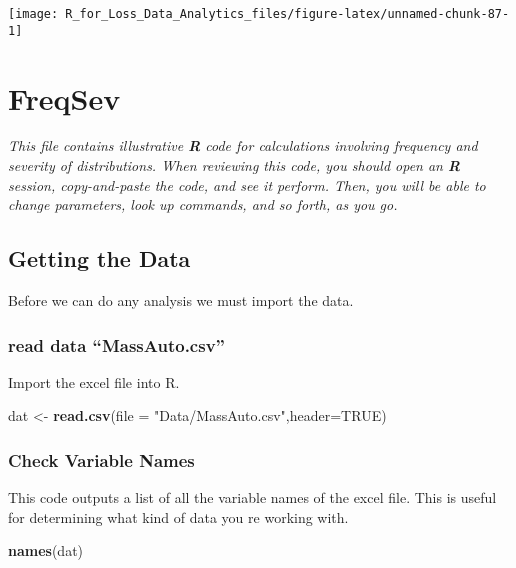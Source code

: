 \documentclass[]{book}
\newenvironment{Shaded}{\begin{snugshade}}{\end{snugshade}}
\newcommand{\KeywordTok}[1]{\textcolor[rgb]{0.13,0.29,0.53}{\textbf{#1}}}
\newcommand{\DataTypeTok}[1]{\textcolor[rgb]{0.13,0.29,0.53}{#1}}
\newcommand{\StringTok}[1]{\textcolor[rgb]{0.31,0.60,0.02}{#1}}
\newcommand{\OtherTok}[1]{\textcolor[rgb]{0.56,0.35,0.01}{#1}}
\newcommand{\NormalTok}[1]{#1}
\theoremstyle{definition}
\theoremstyle{definition}
\theoremstyle{definition}
\theoremstyle{remark}
\begin{document}
\begin{center}\texttt{[image: R\_for\_Loss\_Data\_Analytics\_files/figure-latex/unnamed-chunk-87-1]} \end{center}

\chapter{FreqSev}\label{freqsev}

\emph{This file contains illustrative \textbf{R} code for calculations
involving frequency and severity of distributions. When reviewing this
code, you should open an \textbf{R} session, copy-and-paste the code,
and see it perform. Then, you will be able to change parameters, look up
commands, and so forth, as you go. }

\section{Getting the Data}\label{getting-the-data}

Before we can do any analysis we must import the data.

\subsection{\texorpdfstring{read data
``MassAuto.csv''}{read data MassAuto.csv}}\label{read-data-massauto.csv}

Import the excel file into R.

\begin{Shaded}
\begin{Highlighting}[]
\NormalTok{dat <-}\StringTok{ }\KeywordTok{read.csv}\NormalTok{(}\DataTypeTok{file =} \StringTok{"Data/MassAuto.csv"}\NormalTok{,}\DataTypeTok{header=}\OtherTok{TRUE}\NormalTok{)}
\end{Highlighting}
\end{Shaded}

\subsection{Check Variable Names}\label{check-variable-names}

This code outputs a list of all the variable names of the excel file.
This is useful for determining what kind of data you re working with.

\begin{Shaded}
\begin{Highlighting}[]
\KeywordTok{names}\NormalTok{(dat)}
\end{Highlighting}
\end{Shaded}
\end{document}
